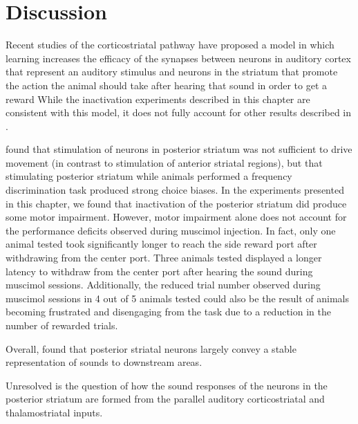 \section{Discussion}

Recent studies of the corticostriatal pathway have proposed a model in which learning increases the efficacy of the synapses between neurons in auditory cortex that represent an auditory stimulus and neurons in the striatum that promote the action the animal should take after hearing that sound in order to get a reward \citep{Znamenskiy2013, Xiong2015} %
%
While the inactivation experiments described in this chapter are consistent with this model,  it does not fully account for other results described in \citet{Guo2018}.
%

\citet{Guo2018} found that stimulation of neurons in posterior striatum was not sufficient to drive movement (in contrast to stimulation of anterior striatal regions), but that stimulating posterior striatum while animals performed a frequency discrimination task produced strong choice biases.
%
In the experiments presented in this chapter, we found that inactivation of the posterior striatum did produce some motor impairment.
%
However, motor impairment alone does not account for the performance deficits
observed during muscimol injection.
%
In fact, only one animal tested took significantly longer to reach the side
reward port after withdrawing from the center port.
%
Three animals tested displayed a longer latency to withdraw from the center port
after hearing the sound during muscimol sessions. 
%
Additionally, the reduced trial number observed during muscimol sessions in 4 out of 5 animals tested could also be the result of animals becoming frustrated and disengaging from the task due to a reduction in the number of rewarded trials.



Overall, \citet{Guo2018} found that posterior striatal neurons largely convey a stable representation of sounds to downstream areas.

Unresolved is the question of how the sound responses of the neurons in the posterior striatum are formed from the parallel auditory corticostriatal and thalamostriatal inputs.
%

